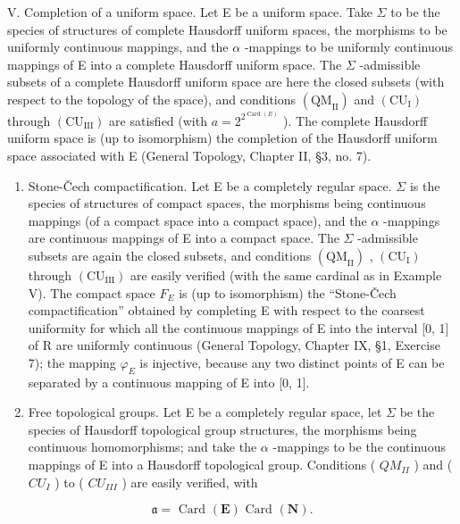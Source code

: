 V. Completion of a uniform space. Let E be a uniform space. Take \(\Sigma\) to be the species of structures of complete Hausdorff uniform spaces, the morphisms to be uniformly continuous mappings, and the \(\alpha\) -mappings to be uniformly continuous mappings of E into a complete Hausdorff uniform space. The \(\Sigma\) -admissible subsets of a complete Hausdorff uniform space are here the closed subsets (with respect to the topology of the space), and conditions \((\mathrm{QM}_{\mathrm{II}})\) and \((\mathrm{CU}_{\mathrm{I}})\) through \((\mathrm{CU}_{\mathrm{III}})\) are satisfied (with \(a = 2^{2^{\operatorname{Card}(E)}}\) ). The complete Hausdorff uniform space is (up to isomorphism) the completion of the Hausdorff uniform space associated with E (General Topology, Chapter II, §3, no. 7).

\begin{enumerate}
\def\labelenumi{\Roman{enumi}.}
\setcounter{enumi}{5}
\item
  Stone-Čech compactification. Let E be a completely regular space. \(\Sigma\) is the species of structures of compact spaces, the morphisms being continuous mappings (of a compact space into a compact space), and the \(\alpha\) -mappings are continuous mappings of E into a compact space. The \(\Sigma\) -admissible subsets are again the closed subsets, and conditions \((\mathrm{QM}_{\mathrm{II}})\) , \((\mathrm{CU}_{\mathrm{I}})\) through \((\mathrm{CU}_{\mathrm{III}})\) are easily verified (with the same cardinal as in Example V). The compact space \(F_{E}\) is (up to isomorphism) the ``Stone-Čech compactification'' obtained by completing E with respect to the coarsest uniformity for which all the continuous mappings of E into the interval {[}0, 1{]} of R are uniformly continuous (General Topology, Chapter IX, §1, Exercise 7); the mapping \(\varphi_{E}\) is injective, because any two distinct points of E can be separated by a continuous mapping of E into {[}0, 1{]}.
\item
  Free topological groups. Let E be a completely regular space, let \(\Sigma\) be the species of Hausdorff topological group structures, the morphisms being continuous homomorphisms; and take the \(\alpha\) -mappings to be the continuous mappings of E into a Hausdorff topological group. Conditions ( \(QM_{II}\) ) and ( \(CU_{I}\) ) to ( \(CU_{III}\) ) are easily verified, with
\end{enumerate}

\[
\mathfrak {a} = \text { Card } (\mathbf {E}) \text { Card } (\mathbf {N}).
\]

